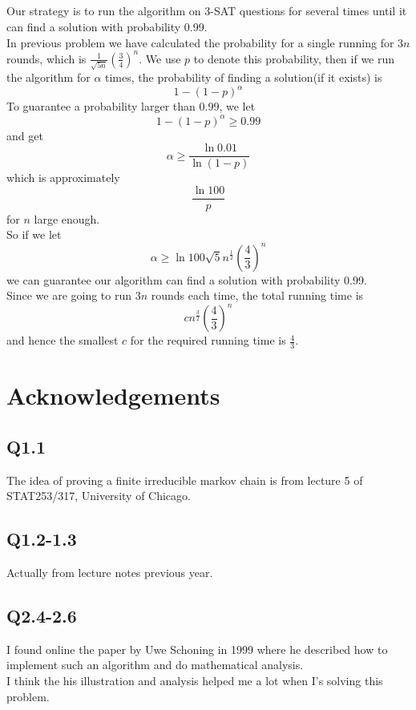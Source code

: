 \documentclass[12pt,letterpaper]{article}
\begin{document}
\subsection{}
Our strategy is to run the algorithm on 3-SAT questions for several times 
until it can find a solution with probability 0.99.\\
In previous problem we have calculated the probability for a single running for $3n$ rounds,
which is $\frac{1}{\sqrt{5n}}\left(\frac{3}{4}\right)^n$.
We use $p$ to denote this probability, 
then if we run the algorithm for $\alpha$ times, 
the probability of finding a solution(if it exists) is 
$$1-(1-p)^{\alpha}$$
To guarantee a probability larger than 0.99,
we let 
$$1-(1-p)^{\alpha}\geq 0.99$$
and get
$$\alpha\geq \frac{\ln0.01}{\ln(1-p)}$$
which is approximately 
$$\frac{\ln 100}{p}$$
for $n$ large enough.\\
So if we let 
$$\alpha\geq \ln100\sqrt{5}n^{\frac{1}{2}}\left(\frac{4}{3}\right)^n$$
we can guarantee our algorithm can find a solution with probability 0.99.\\
Since we are going to run $3n$ rounds each time,
the total running time is 
$$cn^{\frac{3}{2}}\left(\frac{4}{3}\right)^n$$
and hence the smallest $c$ for the required running time is $\frac{4}{3}$.

\newpage
\section{Acknowledgements}
\subsection*{Q1.1}
The idea of proving a finite irreducible markov chain is from lecture 5 of STAT253/317, University of Chicago.
\subsection*{Q1.2-1.3}
Actually from lecture notes previous year.
\subsection*{Q2.4-2.6}
I found online the paper by Uwe Schoning in 1999 
where he described how to implement such an algorithm and do mathematical analysis.\\
I think the his illustration and analysis helped me a lot 
when I's solving this problem.
\end{document}
